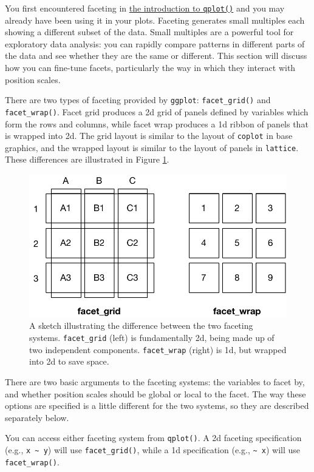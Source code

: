You first encountered faceting in \hyperref[sec:qplot-faceting]{the
introduction to \texttt{qplot()}} and you may already have been using it
in your plots. Faceting generates small multiples each showing a
different subset of the data. Small multiples are a powerful tool for
exploratory data analysis: you can rapidly compare patterns in different
parts of the data and see whether they are the same or different. This
section will discuss how you can fine-tune facets, particularly the way
in which they interact with position scales. 

There are two types of faceting provided by \texttt{ggplot}:
\texttt{facet\_grid()} and \texttt{facet\_wrap()}. Facet grid produces a
2d grid of panels defined by variables which form the rows and columns,
while facet wrap produces a 1d ribbon of panels that is wrapped into 2d.
The grid layout is similar to the layout of \texttt{coplot} in base
graphics, and the wrapped layout is similar to the layout of panels in
\texttt{lattice}. These differences are illustrated in Figure
\ref{fig:facet-sketch}.

\begin{figure}[htbp]
  \centering
    \includegraphics[width=0.5\linewidth]{diagrams/position-facets}
  \caption{A sketch illustrating the difference between the two faceting systems. \texttt{facet\_grid} (left) is fundamentally 2d, being made up of two independent components. \texttt{facet\_wrap} (right) is 1d, but wrapped into 2d to save space.}
  \label{fig:facet-sketch}
\end{figure}

There are two basic arguments to the faceting systems: the variables to
facet by, and whether position scales should be global or local to the
facet. The way these options are specified is a little different for the
two systems, so they are described separately below.

You can access either faceting system from \texttt{qplot()}. A 2d
faceting specification (e.g., \texttt{x \textasciitilde{} y}) will use
\texttt{facet\_grid()}, while a 1d specification (e.g.,
\texttt{\textasciitilde{} x}) will use \texttt{facet\_wrap()}.

